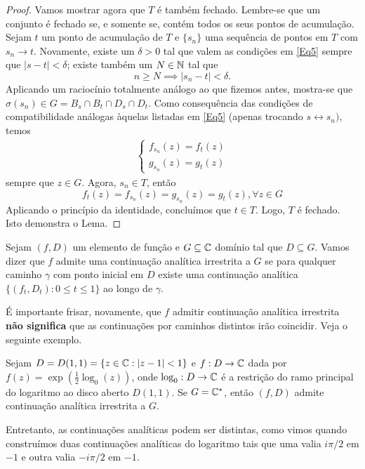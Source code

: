 \begin{proof}
        Vamos mostrar agora que $T$ é também fechado. Lembre-se que um conjunto é fechado 
        se, e somente se, contém todos os seus pontos de acumulação. Sejam $t$ um ponto de
        acumulação de $T$ e $\{s_n\}$ uma sequência de pontos em $T$ com $s_n \to t$. 
        Novamente, existe um $\delta > 0$ tal que valem as condições em \ref{Eq5} sempre que
        $|s-t|<\delta$; existe também um $N \in \mathbb{N}$ tal que
        \begin{equation*}
        n \geq N \implies |s_n - t| < \delta.
        \end{equation*}
        Aplicando um raciocínio totalmente análogo ao que fizemos antes, mostra-se que
        $\sigma(s_n) \in G = B_s \cap B_t \cap D_s \cap D_t$. Como consequência das 
        condições de compatibilidade análogas àquelas listadas em \ref{Eq5} 
        (apenas trocando $s \leftrightarrow s_n)$, temos
        \begin{align*}
            \begin{cases}
                f_{s_n}(z) = f_t(z) \\
                g_{s_n}(z) = g_t(z)
            \end{cases}
        \end{align*}
        sempre que $z \in G$. Agora, $s_n \in T$, então
        \begin{equation*}
            f_t(z) = f_{s_n}(z) = g_{s_n}(z) = g_t(z), \forall z\in G
        \end{equation*}
        Aplicando o princípio da identidade, concluímos que $t \in T$. Logo, $T$ é fechado. 
        Isto demonstra o Lema.
    \end{proof}

    \begin{definicao}
    \label{def-continuacao-irrestrita}
        Sejam $(f,D)$ um elemento de função e $G\subseteq\mathbb{C}$ domínio tal que 
        $D\subseteq G$. Vamos dizer que $f$ admite uma continuação analítica irrestrita a 
        $G$ se para qualquer caminho $\gamma$ com ponto inicial em $D$ existe uma continuação
        analítica $\{(f_t, D_t) : 0\leq t\leq 1\}$ ao longo de $\gamma$.
    \end{definicao}

É importante frisar, novamente, que $f$ admitir continuação analítica irrestrita 
\textbf{não significa} que as continuações por caminhos distintos irão coincidir.
Veja o seguinte exemplo.

    \begin{exemplo}
        Sejam $D = D(1,1) = \{ z\in\mathbb{C} : |z-1|<1 \}$ e $f:D\to\mathbb{C}$ dada por
        $f(z) = \displaystyle{\exp\left( \frac{1}{2}\log_0(z) \right)}$, onde
        $\log_0:D\to\mathbb{C}$ é a restrição do ramo principal do logaritmo ao disco aberto
        $D(1,1)$. Se $G = \mathbb{C}^*$, então $(f,D)$ admite continuação analítica irrestrita
        a $G$.
        
        Entretanto, as continuações analíticas podem ser distintas, como vimos quando
        construímos duas continuações analíticas do logaritmo tais que uma valia 
        $i\pi/2$ em $-1$ e outra valia $-i\pi/2$ em $-1$.
    \end{exemplo}

